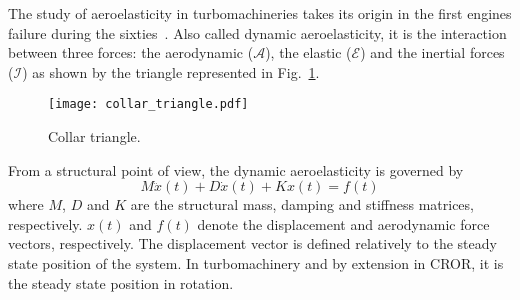 
The study of aeroelasticity in turbomachineries takes its origin
in the first engines failure during the sixties~\cite{Dugundji2003}.
Also called dynamic aeroelasticity,
it is the interaction between three forces:
the aerodynamic ($\mathcal{A}$), the elastic ($\mathcal{E}$) and
the inertial forces ($\mathcal{I}$) as 
shown by the \citet{Collar1946} triangle represented in 
Fig.~\ref{fig:ael_collar_triangle}. 
\begin{figure}[htp]
  \centering
  \texttt{[image: collar\_triangle.pdf]}
  \caption{Collar triangle.}
  \label{fig:ael_collar_triangle}
\end{figure}

From a structural point of view, 
the dynamic aeroelasticity is governed by
\begin{equation}
	M \ddot{x}(t) + D \dot{x}(t) + K x(t) = f(t)
	\label{eq:ael_motion_eq}
\end{equation}
where $M$, $D$ and $K$ are the structural mass, damping 
and stiffness matrices, respectively.
$x(t)$ and $f(t)$ denote the displacement 
and aerodynamic force vectors, respectively. The displacement
vector is defined relatively to the 
steady state position of the system. In turbomachinery
and by extension in CROR, it is the steady state position
in rotation.
